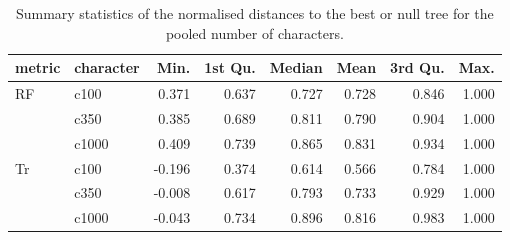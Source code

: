 \begin{table}[ht]
\centering
\begin{tabular}{llrrrrrr}
  \hline
metric & character & Min. & 1st Qu. & Median & Mean & 3rd Qu. & Max. \\ 
  \hline
RF & c100 & 0.371 & 0.637 & 0.727 & 0.728 & 0.846 & 1.000 \\ 
   & c350 & 0.385 & 0.689 & 0.811 & 0.790 & 0.904 & 1.000 \\ 
   & c1000 & 0.409 & 0.739 & 0.865 & 0.831 & 0.934 & 1.000 \\ 
  Tr & c100 & -0.196 & 0.374 & 0.614 & 0.566 & 0.784 & 1.000 \\ 
   & c350 & -0.008 & 0.617 & 0.793 & 0.733 & 0.929 & 1.000 \\ 
   & c1000 & -0.043 & 0.734 & 0.896 & 0.816 & 0.983 & 1.000 \\ 
   \hline
\end{tabular}
\caption{Summary statistics of the normalised distances to the best or null tree for the pooled number of characters.} 
\label{Tab_pooledcharacters}
\end{table}
